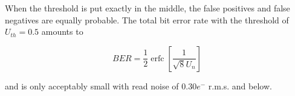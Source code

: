 When the threshold is put exactly in the middle, the false positives and false negatives are equally probable. The total bit error rate with the threshold of $U_{th}=0.5$ amounts to 

\begin{equation}
B E R=\frac{1}{2} \operatorname{erfc}\left[\frac{1}{\sqrt{8} U_{n}}\right]\end{equation}

and is only acceptably small with read noise of 0.30$e^{-}$ r.m.s. and below.
